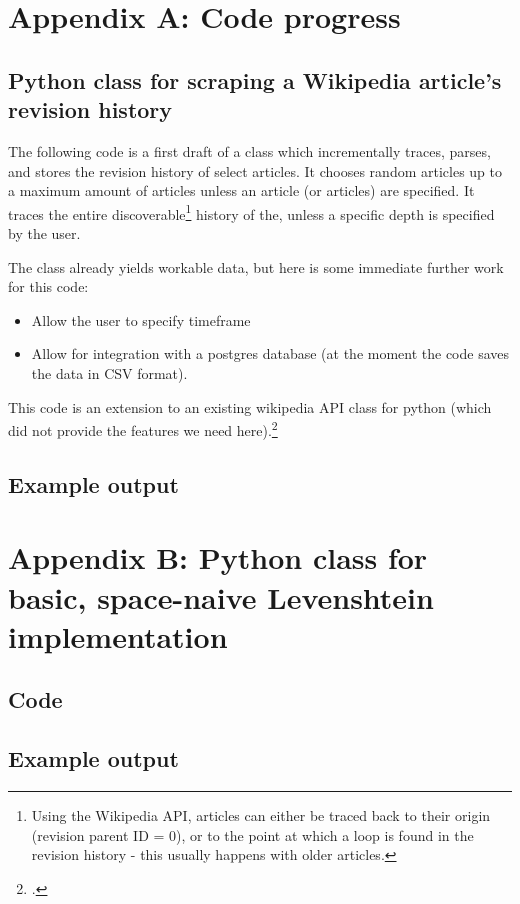 \documentclass[a4paper,11pt,twoside,notitlepage]{article}
\renewcommand{\cite}[1]{\footcite{#1}}
\begin{document}
        
\clearpage
\begin{appendices}
\section{Appendix A: Code progress}
\subsection{Python class for scraping a Wikipedia article's revision history}
The following code is a first draft of a class which incrementally
traces, parses, and stores the revision history of select articles. It
chooses random articles up to a maximum amount of articles unless an
article (or articles) are specified. It traces the entire
discoverable\footnote{Using the Wikipedia API, articles can either be
  traced back to their origin (revision parent ID = 0), or to the
  point at which a loop is found in the revision history - this
  usually happens with older articles.} history of the, unless a
specific depth is specified by the user.

The class already yields workable data, but here is some immediate
further work for this code:
\begin{itemize}
  \item Allow the user to specify timeframe
  \item Allow for integration with a postgres database (at the moment
    the code saves the data in CSV format).
\end{itemize}

This code is an extension to an existing wikipedia API class for
python (which did not provide the features we need
here).\cite{python-wikipedia}


\subsection{Example output}

\clearpage
\section{Appendix B: Python class for basic, space-naive Levenshtein
  implementation}
\subsection{Code}

\subsection{Example output}
\end{appendices}

\clearpage
\printbibheading[heading=bibintoc,title={References}]
\printbibliography[keyword=wiki,heading=subbibliography,title={On wikipedia}]
\printbibliography[keyword=edit,heading=subbibliography,title={On edit
distance in general}]
\end{document}
